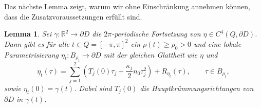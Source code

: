 \documentclass[12pt,a4paper]{scrartcl}
\newtheorem{Lemma}[Satz]{Lemma}
\numberwithin{equation}{section}
\newcommand{\R}{\mathbb{R}} %
\begin{document}
Das nächste Lemma zeigt, warum wir ohne Einschränkung annehmen können, dass die Zusatzvoraussetzungen erfüllt sind.
\begin{Lemma} \label{Llokaleparam}
Sei $\gamma : \R^2 \to \partial D$ die $2 \pi$-periodische Fortsetzung von  $\eta\in C^4(Q,\partial D)$.
Dann gibt es für alle $t \in Q=[-\pi,\pi]^2$ ein $\rho(t) \geq \rho_0>0$ und eine lokale Parametrisierung $ \eta_t : B_{\rho_t} \to \partial D$ mit der gleichen Glattheit wie $\eta$ und
\[
\eta_t(\tau) = \sum_{j=1}^2\left(T_j(0) \tau_j + \frac{\kappa_j}{2} n_0 \tau_j^2 \right) + R_{\eta_t}(\tau), \qquad \tau \in B_{\rho_t},
\]
sowie $\eta_t(0)= \gamma(t)$. Dabei sind $T_j(0)$ die Hauptkrümmungsrichtungen von $\partial D$ in $\gamma(t)$.
\end{Lemma} 
\end{document}
